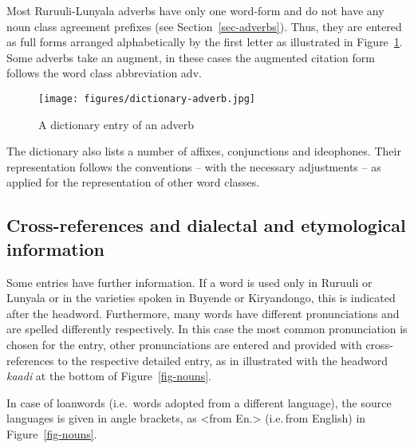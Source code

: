Most Ru\-ruu\-li\hyp{}Lu\-nya\-la adverbs have only one word-form and do not have any noun class agreement prefixes (see Section~\ref{sec-adverbs}). 
Thus, they are entered as full forms arranged alphabetically by the first letter as illustrated in Figure~\ref{fig-adverb}. 
Some adverbs take an augment, in these cases the augmented citation form follows the word class abbreviation adv.

\begin{figure}[htb]
\begin{center}

 \texttt{[image: figures/dictionary-adverb.jpg]}

 \caption{A dictionary entry of an adverb}\label{fig-adverb}
\end{center}
\end{figure}

The dictionary also lists a number of affixes, conjunctions and ideophones. 
Their representation follows the conventions – with the necessary adjustments – as applied for the representation of other word classes.

\subsection{Cross-references and dialectal and etymological information}\label{sec-userguide-dialect}

Some entries have further information. 
If a word is used only in Ruruuli or Lunyala or in the varieties spoken in Buyende or
Kiryandongo, this is indicated after the headword. 
Furthermore, many words have different pronunciations and are spelled differently respectively. 
In this case the most common pronunciation is chosen for the entry, other pronunciations are entered and provided with cross-references to the respective detailed entry, as in illustrated with the headword \emph{kaadi} at the bottom of  Figure~\ref{fig-nouns}.

In case of loanwords (i.e.\, words adopted from a different language), the source languages is given in angle brackets, as <from En.> (i.e.\,from English) in Figure~\ref{fig-nouns}.
